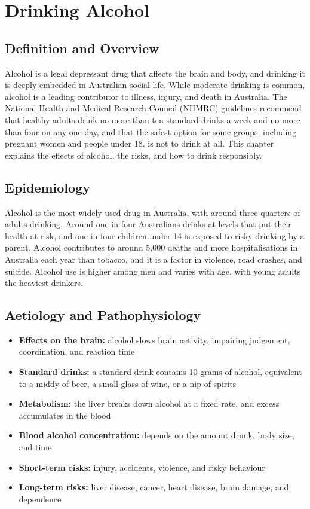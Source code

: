 \chapter{Drinking Alcohol}

\section*{Definition and Overview}
Alcohol is a legal depressant drug that affects the brain and body, and drinking it is deeply embedded in Australian social life. While moderate drinking is common, alcohol is a leading contributor to illness, injury, and death in Australia. The National Health and Medical Research Council (NHMRC) guidelines recommend that healthy adults drink no more than ten standard drinks a week and no more than four on any one day, and that the safest option for some groups, including pregnant women and people under 18, is not to drink at all. This chapter explains the effects of alcohol, the risks, and how to drink responsibly.

\section*{Epidemiology}
Alcohol is the most widely used drug in Australia, with around three-quarters of adults drinking. Around one in four Australians drinks at levels that put their health at risk, and one in four children under 14 is exposed to risky drinking by a parent. Alcohol contributes to around 5,000 deaths and more hospitalisations in Australia each year than tobacco, and it is a factor in violence, road crashes, and suicide. Alcohol use is higher among men and varies with age, with young adults the heaviest drinkers.

\section*{Aetiology and Pathophysiology}
\begin{itemize}
    \item \textbf{Effects on the brain:} alcohol slows brain activity, impairing judgement, coordination, and reaction time
    \item \textbf{Standard drinks:} a standard drink contains 10 grams of alcohol, equivalent to a middy of beer, a small glass of wine, or a nip of spirits
    \item \textbf{Metabolism:} the liver breaks down alcohol at a fixed rate, and excess accumulates in the blood
    \item \textbf{Blood alcohol concentration:} depends on the amount drunk, body size, and time
    \item \textbf{Short-term risks:} injury, accidents, violence, and risky behaviour
    \item \textbf{Long-term risks:} liver disease, cancer, heart disease, brain damage, and dependence
\end{itemize}

